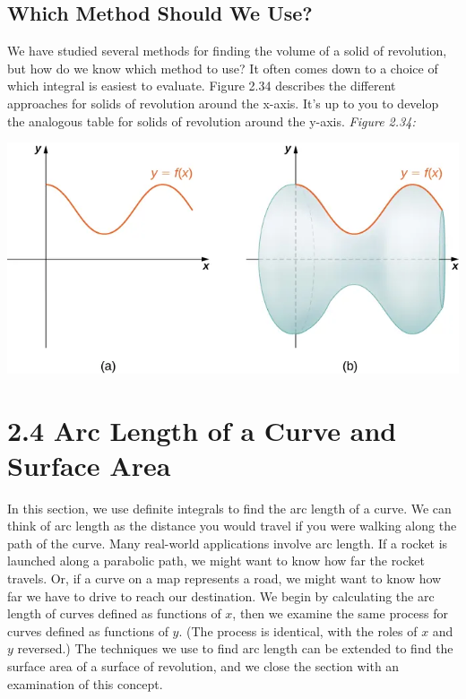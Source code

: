 \documentclass{report}
\begin{document}
    \bigbreak \noindent 
    \subsection*{Which Method Should We Use?}
    \bigbreak \noindent 
    We have studied several methods for finding the volume of a solid of revolution, but how do we know which method to use? It often comes down to a choice of which integral is easiest to evaluate. Figure 2.34 describes the different approaches for solids of revolution around the  x-axis.
      It’s up to you to develop the analogous table for solids of revolution around the  y-axis.
      \bigbreak \noindent 
      \textit{Figure 2.34:}
      \bigbreak \noindent 
      \begin{center}
          \includegraphics[scale=0.5]{./figures/graph31.png}
      \end{center}

      \pagebreak \bigbreak \noindent 
      \section*{2.4 Arc Length of a Curve and Surface Area}
      \bigbreak \noindent 
      In this section, we use definite integrals to find the arc length of a curve. We can think of arc length as the distance you would travel if you were walking along the path of the curve. Many real-world applications involve arc length. If a rocket is launched along a parabolic path, we might want to know how far the rocket travels. Or, if a curve on a map represents a road, we might want to know how far we have to drive to reach our destination.
      \bigbreak \noindent 
        We begin by calculating the arc length of curves defined as functions of \(x\), then we examine the same process for curves defined as functions of \(y\). (The process is identical, with the roles of \(x\) and \(y\) reversed.) The techniques we use to find arc length can be extended to find the surface area of a surface of revolution, and we close the section with an examination of this concept.
\end{document}
